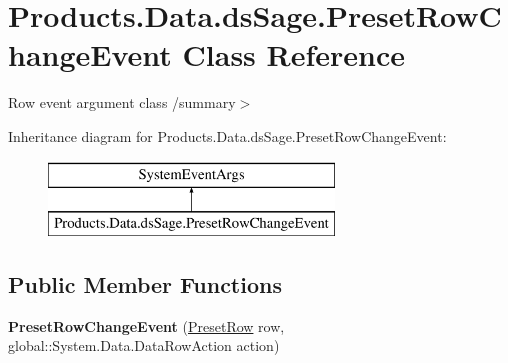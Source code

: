 \hypertarget{class_products_1_1_data_1_1ds_sage_1_1_preset_row_change_event}{}\section{Products.\+Data.\+ds\+Sage.\+Preset\+Row\+Change\+Event Class Reference}
\label{class_products_1_1_data_1_1ds_sage_1_1_preset_row_change_event}


Row event argument class /summary$>$  


Inheritance diagram for Products.\+Data.\+ds\+Sage.\+Preset\+Row\+Change\+Event\+:\begin{figure}[H]
\begin{center}
\leavevmode
\includegraphics[height=2.000000cm]{class_products_1_1_data_1_1ds_sage_1_1_preset_row_change_event}
\end{center}
\end{figure}
\subsection*{Public Member Functions}
\begin{DoxyCompactItemize}
\item 
{\bfseries Preset\+Row\+Change\+Event} (\hyperlink{class_products_1_1_data_1_1ds_sage_1_1_preset_row}{Preset\+Row} row, global\+::\+System.\+Data.\+Data\+Row\+Action action)\hypertarget{class_products_1_1_data_1_1ds_sage_1_1_preset_row_change_event_a7cde1a39dd460e28a92d4e0ad48a5a4c}{}\label{class_products_1_1_data_1_1ds_sage_1_1_preset_row_change_event_a7cde1a39dd460e28a92d4e0ad48a5a4c}

\end{DoxyCompactItemize}
